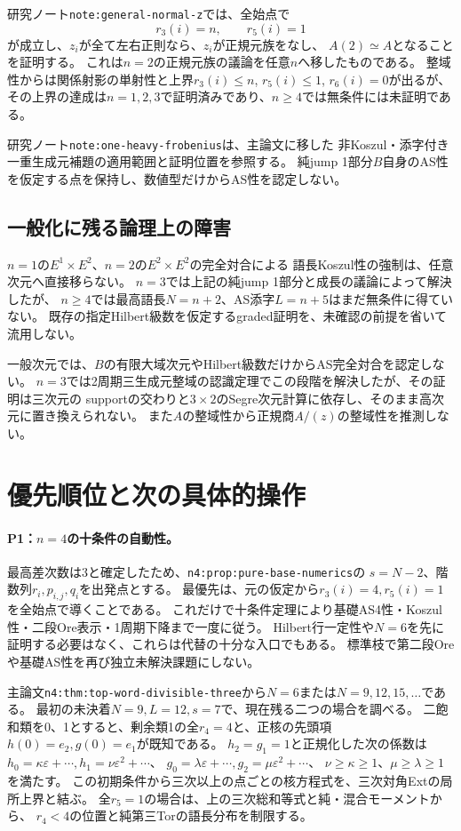 \documentclass[11pt,a4paper]{ltjsarticle}
\begin{document}
研究ノート\texttt{note:general-normal-z}では、全始点で
\[
r_3(i)=n,\qquad r_5(i)=1
\]
が成立し、$z_i$が全て左右正則なら、$z_i$が正規元族をなし、
$A(2)\simeq A$となることを証明する。
これは$n=2$の正規元族の議論を任意$n$へ移したものである。
整域性からは関係射影の単射性と上界$r_3(i)\leq n$, $r_5(i)\leq1$, $r_6(i)=0$が出るが、
その上界の達成は$n=1,2,3$で証明済みであり、$n\geq4$では無条件には未証明である。

研究ノート\texttt{note:one-heavy-frobenius}は、主論文に移した
非Koszul・添字付き一重生成元補題の適用範囲と証明位置を参照する。
純jump 1部分$B$自身のAS性を仮定する点を保持し、数値型だけからAS性を認定しない。

\subsection{一般化に残る論理上の障害}
$n=1$の$E^1\times E^2$、$n=2$の$E^2\times E^2$の完全対合による
語長Koszul性の強制は、任意次元へ直接移らない。
$n=3$では上記の純jump 1部分と成長の議論によって解決したが、
$n\geq4$では最高語長$N=n+2$、AS添字$L=n+5$はまだ無条件に得ていない。
既存の指定Hilbert級数を仮定するgraded証明を、未確認の前提を省いて流用しない。

一般次元では、$B$の有限大域次元やHilbert級数だけからAS完全対合を認定しない。
$n=3$では2周期三生成元整域の認識定理でこの段階を解決したが、その証明は三次元の
supportの交わりと$3\times2$のSegre次元計算に依存し、そのまま高次元に置き換えられない。
また$A$の整域性から正規商$A/(z)$の整域性を推測しない。

\section{優先順位と次の具体的操作}
\paragraph{P1：$n=4$の十条件の自動性。}
最高差次数は3と確定したため、\texttt{n4:prop:pure-base-numerics}の
$s=N-2$、階数列$r_i,p_{i,j},q_i$を出発点とする。
最優先は、元の仮定から$r_3(i)=4,r_5(i)=1$を全始点で導くことである。
これだけで十条件定理により基礎AS4性・Koszul性・二段Ore表示・1周期下降まで一度に従う。
Hilbert行一定性や$N=6$を先に証明する必要はなく、これらは代替の十分な入口でもある。
標準枝で第二段Oreや基礎AS性を再び独立未解決課題にしない。

主論文\texttt{n4:thm:top-word-divisible-three}から$N=6$または$N=9,12,15,\ldots$である。
最初の未決着$N=9,L=12,s=7$で、現在残る二つの場合を調べる。
二飽和類を0、1とすると、剰余類1の全$r_4=4$と、正核の先頭項$h(0)=e_2,g(0)=e_1$が既知である。
$h_2=g_1=1$と正規化した次の係数は
$h_0=\kappa\varepsilon+\cdots,h_1=\nu\varepsilon^2+\cdots$、
$g_0=\lambda\varepsilon+\cdots,g_2=\mu\varepsilon^2+\cdots$、
$\nu\ge\kappa\ge1$、$\mu\ge\lambda\ge1$を満たす。
この初期条件から三次以上の点ごとの核方程式を、三次対角Extの局所上界と結ぶ。
全$r_5=1$の場合は、上の三次総和等式と純・混合モーメントから、
$r_4<4$の位置と純第三Torの語長分布を制限する。
\end{document}
